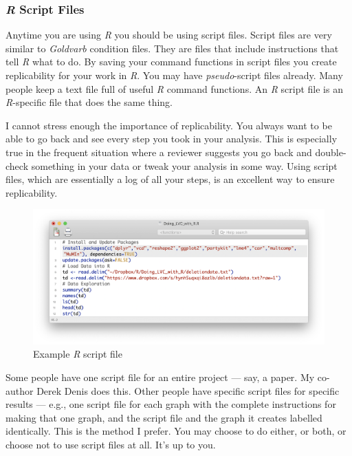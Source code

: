 \documentclass[
  10pt,
  letterpaper]{article}
\begin{document}
\hypertarget{r-script-files}{%
\subsubsection{\texorpdfstring{\emph{R} Script
Files}{R Script Files}}\label{r-script-files}}

Anytime you are using \emph{R} you should be using script files. Script
files are very similar to \emph{Goldvarb} condition files. They are
files that include instructions that tell \emph{R} what to do. By saving
your command functions in script files you create replicability for your
work in \emph{R}. You may have \emph{pseudo}-script files already. Many
people keep a text file full of useful \emph{R} command functions. An
\emph{R} script file is an \emph{R}-specific file that does the same
thing.

I cannot stress enough the importance of replicability. You always want
to be able to go back and see every step you took in your analysis. This
is especially true in the frequent situation where a reviewer suggests
you go back and double-check something in your data or tweak your
analysis in some way. Using script files, which are essentially a log of
all your steps, is an excellent way to ensure replicability.

\begin{figure}

{\centering \includegraphics{images/scriptfile.png}

}

\caption{\label{fig-scriptfile}Example \emph{R} script file}

\end{figure}

Some people have one script file for an entire project --- say, a paper.
My co-author Derek Denis does this. Other people have specific script
files for specific results --- e.g., one script file for each graph with
the complete instructions for making that one graph, and the script file
and the graph it creates labelled identically. This is the method I
prefer. You may choose to do either, or both, or choose not to use
script files at all. It's up to you.
\end{document}
